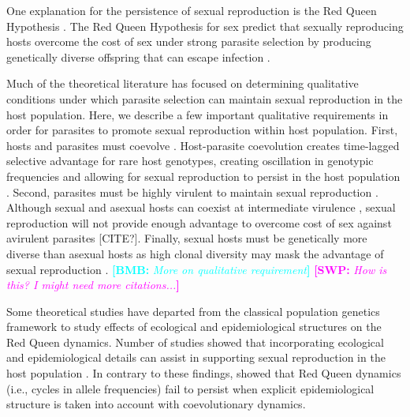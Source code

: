 \documentclass{article}\usepackage[]{graphicx}\usepackage[]{color}
\newcommand{\comment}[3]{\textcolor{#1}{\textbf{[#2: }\textit{#3}\textbf{]}}}
\newcommand{\bmb}[1]{\comment{cyan}{BMB}{#1}}
\newcommand{\swp}[1]{\comment{magenta}{SWP}{#1}}
\begin{document}
One explanation for the persistence of sexual reproduction is the Red Queen Hypothesis \citep{bell1982masterpiece}.
The Red Queen Hypothesis for sex predict that sexually reproducing hosts overcome the cost of sex under strong parasite selection by producing genetically diverse offspring that can escape infection \citep{jbs1949disease, jaenike1978hypothesis, hamilton1980sex}.

Much of the theoretical literature has focused on determining qualitative conditions under which parasite selection can maintain sexual reproduction in the host population.
Here, we describe a few important qualitative requirements in order for parasites to promote sexual reproduction within host population.
First, hosts and parasites must coevolve \citep{bell1982masterpiece}.
Host-parasite coevolution creates time-lagged selective advantage for rare host genotypes, creating oscillation in genotypic frequencies and allowing for sexual reproduction to persist in the host population \citep{clarke1976ecological, hamilton1980sex}.
Second, parasites must be highly virulent to maintain sexual reproduction \citep{may1983epidemiology}.
Although sexual and asexual hosts can coexist at intermediate virulence \citep{howard1994parasitism}, sexual reproduction will not provide enough advantage to overcome cost of sex against avirulent parasites [CITE?].
Finally, sexual hosts must be genetically more diverse than asexual hosts as high clonal diversity may mask the advantage of sexual reproduction \citep{lively2010review, ashby2015diversity}.
\bmb{More on qualitative requirement}
\swp{How is this? I might need more citations...}

Some theoretical studies have departed from the classical population genetics framework to study effects of ecological and epidemiological structures on the Red Queen dynamics.
Number of studies showed that incorporating ecological and epidemiological details can assist in supporting sexual reproduction in the host population \citep{galvani2001antigenic, galvani2003maintenance, lively2009maintenance, lively2010epidemiological}.
In contrary to these findings, \cite{macpherson2017joint} showed that Red Queen dynamics (i.e., cycles in allele frequencies) fail to persist when explicit epidemiological structure is taken into account with coevolutionary dynamics.
\end{document}
